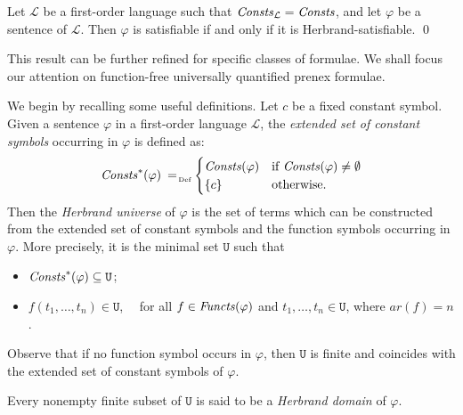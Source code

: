 \documentclass[a4paper]{llncs}
\newcommand{\Lang}{\ensuremath{\mathcal{L}\xspace}} %
\newcommand{\LangConsts}{\Consts_{\Lang}}
\newcommand{\Univ}{\mathtt{U}}
\newcommand{\ar}{\mathit{ar}}
\begin{document}
\begin{theorem}\label{HERSENT}
Let $\Lang$ be a first-order
language such that $\LangConsts=\Consts$, and let $\varphi$ be a sentence of
$\Lang$.
Then $\varphi$ is satisfiable if and only if it is Herbrand-satisfiable.
\qed
\end{theorem}
%
This result can be further refined for specific classes of formulae.
We shall focus our attention on function-free
universally quantified prenex formulae.

We begin by recalling some useful
definitions. Let $c$ be a fixed constant symbol. Given a sentence 
$\varphi$ in a first-order language $\Lang$, the \emph{extended set 
of constant symbols} occurring in $\varphi$ is defined as:
\[
\Consts^*(\varphi) \defAs
\begin{cases}
\Consts(\varphi) & \text{if } \Consts(\varphi) \neq \emptyset\\
\{c\} & \text{otherwise.}
\end{cases}
\]
Then the \emph{Herbrand universe} of $\varphi$ is the set of terms which can
be constructed from the extended set of constant symbols and the 
function symbols occurring in $\varphi$.
More precisely, it is the minimal set $\Univ$ such that
\begin{itemize}
\item $\Consts^*(\varphi) \subseteq \Univ$;
%

\item $f(t_1, \ldots, t_n) \in \Univ$, ~~for all $f \in 
\mathit{Functs}(\varphi)$ and $t_1, \ldots, t_n \in \Univ$, where $\ar(f)=n$.
\end{itemize}
Observe that if no function symbol occurs in $\varphi$, then $\Univ$ 
is finite and coincides with the extended set of constant symbols of 
$\varphi$.

Every nonempty finite subset of $\Univ$ is said to be a
\emph{Herbrand domain} of $\varphi$.
\end{document}
